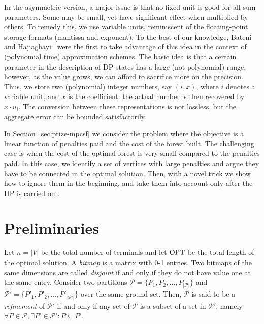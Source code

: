 \documentclass[extras,11pt]{article} \usepackage{fullpage}
\theoremstyle{mytheorem}
\newcommand{\OPT}{\mbox{\rm OPT}}
\begin{document}
In the asymmetric version, a major issue is that no fixed unit is good for all sum parameters.  
Some may be small, yet have significant effect when multiplied by others.
To remedy this, we use variable units, reminiscent of the floating-point  storage formats (mantissa and exponent).
To the best of our knowledge, Bateni and Hajiaghayi~\cite{BH09:facility} were the first to take advantage of this idea in the context of (polynomial time) approximation schemes.
The basic idea is that a certain parameter in the description of DP states has a large (not polynomial) range,
however, as the value grows, we can afford to sacrifice more on the precision.
Thus, we store two (polynomial) integer numbers, say $(i, x)$, where $i$ denotes a variable unit, and $x$ is the coefficient: the actual number is then recovered by $x\cdot u_i$.
The conversion between these representations is not lossless, but the aggregate error can be bounded satisfactorily.

In Section~\ref{sec:prize-mpcsf} we consider the problem where the objective is a linear function of penalties paid and the cost of the forest built.
The challenging case is when the cost of the optimal forest is very small compared to the penalties paid.  
In this case, we identify a set of vertices with large penalties and argue they have to be connected in the optimal solution.  
Then, with a novel trick we show how to ignore them in the beginning, and take them into account only after the DP is carried out.


\section{Preliminaries}\label{sec:prelim}
Let $n=|V|$ be the total number of terminals and let $\OPT$ be the total length of the optimal solution.
A \emph{bitmap} is a matrix with 0-1 entries.
Two bitmaps of the same dimensions are called \emph{disjoint} if and only if they do not have value one at the same entry.
Consider two partitions $\mathcal{P}=\{P_1, P_2, \dots,P_{|\mathcal{P}|}\}$  and $\mathcal{P'}=\{P'_1, P'_2, \dots,P'_{|\mathcal{P'}|}\}$ over the same ground set.
Then, $\mathcal{P}$ is said to be a \emph{refinement} of $\mathcal{P}'$
if and only if
any set of $\mathcal{P}$ is a subset of a set in $\mathcal{P}'$, namely $\forall P\in\mathcal{P}, \exists P'\in\mathcal{P}': P\subseteq P'$.
\end{document}
